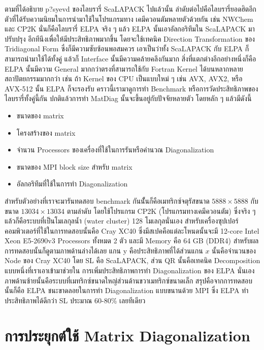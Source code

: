 ตามที่ได้อธิบาย p?syevd ของไลบรารี่ ScaLAPACK ไปแล้วนั้น ลำดับต่อไปคือไลบรารี่ยอดฮิตอีกตัวที่ได้รับความนิยมในการนำมาใช้ในโปรแกรมทาง%
เคมีควอนตัมหลายตัวด้วยกัน เช่น NWChem และ CP2K นั่นก็คือไลบรารี่ ELPA จริง ๆ แล้ว ELPA นั้นเอาอัลกอริทึมใน ScaLAPACK มาปรับปรุง%
อีกทีนึงเพื่อให้มีประสิทธิภาพมากขึ้น โดยจะใช้เทคนิค Direction Transformation ของ Tridiagonal Form ซึ่งก็มีความซับซ้อนพอสมควร 
เอาเป็นว่าทั้ง ScaLAPACK กับ ELPA ก็สามารถนำมาใช้ได้ทั้งคู่ แล้วก็ Interface นั้นมีความคล้ายคลึงกันมาก สิ่งที่แตกต่างอีกอย่างหนึ่งก็คือ ELPA 
นั้นมีความ General มากกว่าตรงที่สามารถใช้กับ Fortran Kernel ได้บนหลากหลายสถาปัตยกรรมมากกว่า เช่น ถ้า Kernel ของ CPU เป็นแบบใหม่ ๆ 
เช่น AVX, AVX2, หรือ AVX-512 นั้น ELPA ก็จะรองรับ คราวนี้เรามาดูการทำ Benchmark หรือการวัดประสิทธิภาพของไลบรารี่ทั้งคู่นี้กัน
ปกติแล้วการทำ MatDiag นั้นจะขึ้นอยู่กับปัจจัยหลายตัว โดยหลัก ๆ แล้วมีดังนี้

\begin{itemize}
    \item ขนาดของ matrix
    \item โครงสร้างของ matrix
    \item จำนวน Processors ของเครื่องที่ใช้ในการรันหรือคำนวณ Diagonalization
    \item ขนาดของ MPI block size สำหรับ matrix
    \item อัลกอริทึมที่ใช้ในการทำ Diagonalization
\end{itemize}

สำหรับตัวอย่างที่เราจะมารันทดสอบ benchmark กันนัั้นก็คือเมทริกซ์จตุรัสขนาด $5888 \times 5888$ กับขนาด $13034 \times 13034$ 
ตามลำดับ โดยใช้โปรแกรม CP2K (โปรแกรมทางเคมีควอนตัม) ซึ่งจริง ๆ แล้วก็คือระบบที่เป็นโมเลกุลน้ำ (water cluster) 128 โมเลกุลนั่นเอง
สำหรับเครื่องซุปเปอร์คอมพิวเตอร์ที่ใช้ในการทดสอบนั้นคือ Cray XC40 ซึ่งมีสเปคคือแต่ละโหนดนั้นจะมี 12-core Intel Xeon E5-2690v3 Processors 
ทั้งหมด 2 ตัว และมี Memory คือ 64 GB (DDR4) สำหรับผลการทดสอบนั้นก็ดูตามภาพด้านล่างได้เลย แกน y คือประสิทธิภาพที่ได้ส่วนแกน $x$ 
นั้นคือจำนวนของ Node ของ Cray XC40 โดย SL คือ ScaLAPACK, ส่วน QR นั้นคือเทคนิค Decomposition แบบหนึ่งที่เราเอาเข้ามาช่วยใน%
การเพิ่มประสิทธิภาพการทำ Diagonalization ของ ELPA นั่นเอง ภาพด้านซ้ายนั้นคือระบบที่เมทริกซ์ขนาดใหญ่ส่วนด้านขวาเมทริกซ์ขนาดเล็ก
สรุปคือจากการทดสอบนั้นก็คือ ELPA ชนะขาดลอยในการทำ Diagonalization แบบขนานด้วย MPI ซึ่ง ELPA ทำประสิทธิภาพได้ดีกว่า SL 
ประมาณ 60-80\% เลยทีเดียว

\section{การประยุกต์ใช้ Matrix Diagonalization}

